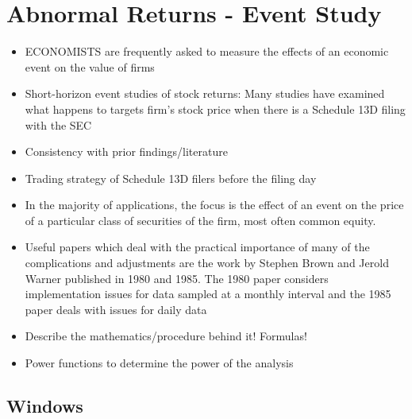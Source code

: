 \documentclass[12pt]{article}
\begin{document}
\section{Abnormal Returns - Event Study} 


    \begin{itemize}
        
        \item ECONOMISTS are frequently asked to measure the effects of an economic event on the value of firms \citep{MacKinlay1997}

        \item Short-horizon event studies of stock returns: Many studies have examined what happens to targets firm’s stock price when there is a Schedule 13D filing with the SEC \citep{CoffeeJr.2014}

        \item Consistency with prior findings/literature

        \item Trading strategy of Schedule 13D filers before the filing day \citep{Collin-Dufresne2015}
        
        \item In the majority of applications, the focus is the effect of an event on the price of a particular class of securities of the firm, most often common equity. \citep{MacKinlay1997}

        \item Useful papers which deal with the practical importance of many of the complications and adjustments are the work by Stephen Brown and Jerold Warner published in 1980 and 1985. The 1980 paper considers implementation issues for data sampled at a monthly interval and the 1985 paper deals with issues for daily data \citep{MacKinlay1997}

        \item Describe the mathematics/procedure behind it! Formulas! 

        \item Power functions to determine the power of the analysis

    \end{itemize}

\subsection{Windows}
\end{document}
